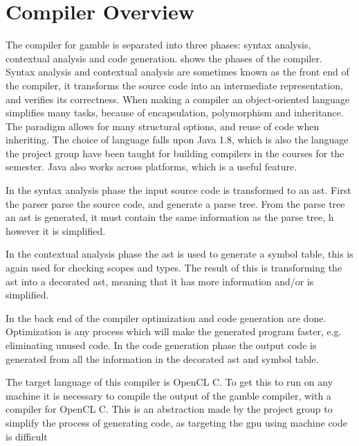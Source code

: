 \chapter{Compiler Overview}

The compiler for \gls{gamble} is separated into three phases: syntax analysis, contextual analysis and code generation.
 shows the phases of the compiler.
Syntax analysis and contextual analysis are sometimes known as the front end of the compiler, it transforms the source code into an intermediate representation, and verifies its correctness.
When making a compiler an object-oriented language simplifies many tasks, because of encapsulation, polymorphism and inheritance. 
The paradigm allows for many structural options, and reuse of code when inheriting. 
The choice of language falls upon Java 1.8, which is also the language the project group have been taught for building compilers in the courses for the semester.
Java also works across platforms, which is a useful feature.

In the syntax analysis phase the input source code is transformed to an \acrfull{ast}. 
First the parser parse the source code, and generate a parse tree.
From the parse tree an \acrshort{ast} is generated, it must contain the same information as the parse tree, h however it is simplified. 

In the contextual analysis phase the \acrshort{ast} is used to generate a symbol table, this is again used for checking scopes and types. 
The result of this is transforming the \acrshort{ast} into a decorated \acrshort{ast}, meaning that it has more information and/or is simplified. 

In the back end of the compiler optimization and code generation are done.
Optimization is any process which will make the generated program faster, e.g. eliminating unused code. 
In the code generation phase the output code is generated from all the information in the decorated \acrshort{ast} and symbol table.

The target language of this compiler is OpenCL C.
To get this to run on any machine it is necessary to compile the output of the \gls{gamble} compiler, with a compiler for OpenCL C.
This is an abstraction made by the project group to simplify the process of generating code, as targeting the \acrshort{gpu} using machine code is difficult


